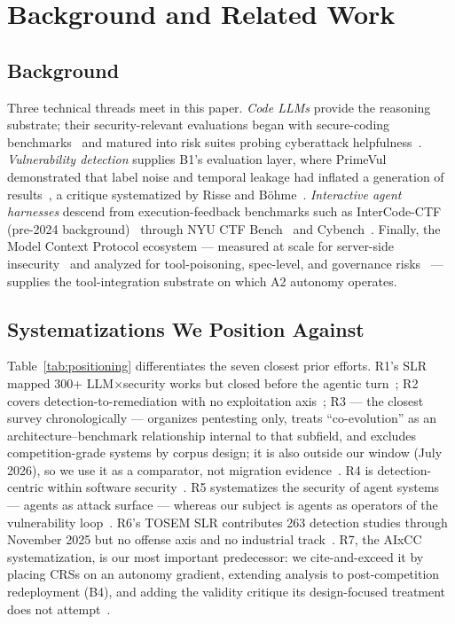 \section{Background and Related Work}
\label{sec:related}

\subsection{Background}
Three technical threads meet in this paper. \emph{Code LLMs} provide the reasoning substrate;
their security-relevant evaluations began with secure-coding benchmarks~\cite{csev12023} and
matured into risk suites probing cyberattack helpfulness~\cite{csev22024,csev32024}.
\emph{Vulnerability detection} supplies B1's evaluation layer, where PrimeVul demonstrated that
label noise and temporal leakage had inflated a generation of results~\cite{primevul2024},
a critique systematized by Risse and B\"ohme~\cite{rissebohme2024}. \emph{Interactive
agent harnesses} descend from execution-feedback benchmarks such as InterCode-CTF
(pre-2024 background)~\cite{intercode2023} through NYU CTF Bench~\cite{nyuctfbench2024} and
Cybench~\cite{cybench2024}. Finally, the Model Context Protocol ecosystem --- measured at
scale for server-side insecurity~\cite{mcpfirstlook2025} and analyzed for tool-poisoning,
spec-level, and governance risks~\cite{mcppoisoning2026,mcpspec2026,mcpgovernance2025} ---
supplies the tool-integration substrate on which A2 autonomy operates.

\subsection{Systematizations We Position Against}
Table~\ref{tab:positioning} differentiates the seven closest prior efforts. R1's SLR mapped
300+ LLM$\times$security works but closed before the agentic turn~\cite{zhang2024when}; R2
covers detection-to-remediation with no exploitation axis~\cite{r2slr2024remediation}; R3 ---
the closest survey chronologically --- organizes pentesting only, treats ``co-evolution'' as an
architecture--benchmark relationship internal to that subfield, and excludes competition-grade
systems by corpus design; it is also outside our window (July 2026), so we use it as a
comparator, not migration evidence~\cite{r3survey2026pentest}. R4 is detection-centric within
software security~\cite{sheng2025csur}. R5 systematizes the security of agent systems ---
agents as attack surface --- whereas our subject is agents as operators of the vulnerability
loop~\cite{r5usenix26agentic}. R6's TOSEM SLR contributes 263 detection studies through
November 2025 but no offense axis and no industrial track~\cite{tosemslr2026}. R7, the AIxCC
systematization, is our most important predecessor: we cite-and-exceed it by placing CRSs on
an autonomy gradient, extending analysis to post-competition redeployment (B4), and adding the
validity critique its design-focused treatment does not attempt~\cite{r7sokaixcc2026}.

